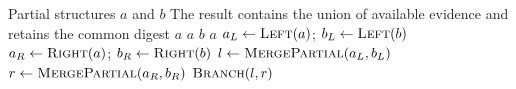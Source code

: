 \begin{algorithm}[htbp]
\caption{Deep Merge of Compatible Structures}
\label{alg:merge-partial}
\begin{algorithmic}[1]
\Require Partial structures $a$ and $b$
\Ensure The result contains the union of available evidence and retains the common digest
    \State {}
  \EndIf
    \State \Return $a$
    \State \Return $a$
    \State \Return $b$
    \State \Return $a$
  \Else
    \State $a_L \gets \Call{Left}{a}$; $b_L \gets \Call{Left}{b}$
    \State $a_R \gets \Call{Right}{a}$; $b_R \gets \Call{Right}{b}$
    \State $l \gets \Call{MergePartial}{a_L,b_L}$
    \State $r \gets \Call{MergePartial}{a_R,b_R}$
    \State \Return $\Call{Branch}{l,r}$
  \EndIf
\EndFunction
\end{algorithmic}
\end{algorithm}

